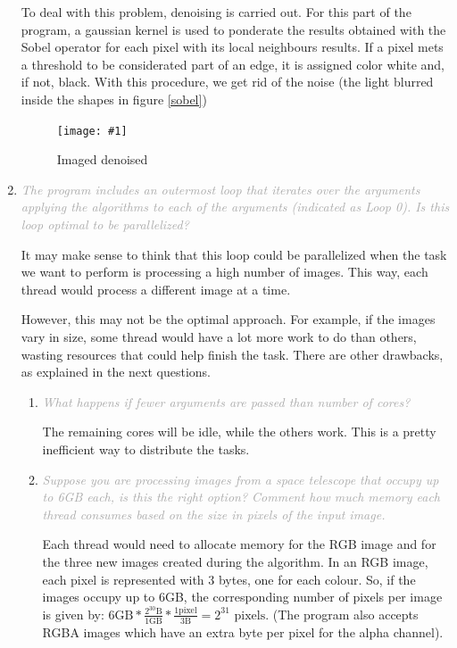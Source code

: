 \documentclass{article}
\newcommand{\myFigure}[4]{%
    \begin{figure}[!ht]
        \texttt{[image: \#1]}
        \centering
        \caption{#2}
        \label{#3}
    \end{figure}
}
\newcommand{\greyItem}[1]{\item\emph{\textcolor{darkgray}{#1}}}
\begin{document}
\begin{enumerate}[label=5.\arabic*,leftmargin=*]
To deal with this problem, denoising is carried out. For this part of the program, a gaussian kernel is used to ponderate the results obtained with the Sobel operator for each pixel with its local neighbours results. If a pixel mets a threshold to be considerated part of an edge, it is assigned color white and, if not, black. With this procedure, we get rid of the noise (the light blurred inside the shapes in figure \ref{sobel}) 

\myFigure{../material/img/im4_grad_denoised}{Imaged denoised}{denoised}{0.35}


\newpage
\greyItem{The program includes an outermost loop that iterates over the arguments applying the algorithms to each of the arguments (indicated as Loop 0). Is this loop optimal to be parallelized?}

It may make sense to think that this loop could be parallelized when the task we want to perform is processing a high number of images. This way, each thread would process a different image at a time.

However, this may not be the optimal approach. For example, if the images vary in size, some thread would have a lot more work to do than others, wasting resources that could help finish the task. There are other drawbacks, as explained in the next questions.

    \begin{enumerate}
        \greyItem{What happens if fewer arguments are passed than number of cores?}
            
        The remaining cores will be idle, while the others work. This is a pretty inefficient way to distribute the tasks.

        \greyItem{Suppose you are processing images from a space telescope that occupy up to 6GB each, is this the right option? Comment how much memory each thread consumes based on the size in pixels of the input image.}

        Each thread would need to allocate memory for the RGB image and for the three new images created during the algorithm. In an RGB image, each pixel is represented with 3 bytes, one for each colour. So, if the images occupy up to 6GB, the corresponding number of pixels per image is given by: ${6\text{GB}}*\frac{2^{30}\text{B}}{1\text{GB}}*\frac{1\text{pixel}}{3\text{B}}=2^{31}\text{ pixels}$. (The program also accepts RGBA images which have an extra byte per pixel for the alpha channel).
        

\end{enumerate}
\end{enumerate}
\end{document}
